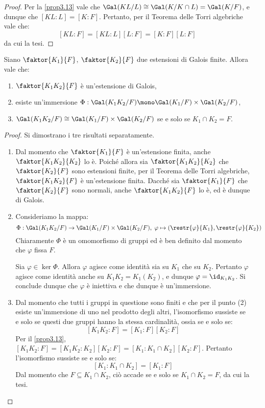 \documentclass[11pt]{scrartcl}
\begin{document}
	\begin{proof}
		Per la \autoref{prop3.13} vale che $\Gal(KL/L) \cong \Gal(K/K \cap L) =
		\Gal(K/F)$, e dunque che $[KL : L] = [K : F]$. Pertanto, per il Teorema
		delle Torri algebriche vale che:
		\[ [KL : F] = [KL : L] [L : F] = [K : F] [L : F] \]
		da cui la tesi.
	\end{proof}
	
	\begin{proposition}
		\label{prop3.15}
		Siano $\faktor{K_1}{F}$, $\faktor{K_2}{F}$ due estensioni di Galois finite. 
		Allora vale che:
		\begin{enumerate}[(1)]
			\item $\faktor{K_1K_2}{F}$ è un'estensione di Galois,
			\item esiste un'immersione $\Phi: \Gal(K_1K_2/F) \mono 
			\Gal(K_1/F)\times\Gal(K_2/F)$,
			\item $\Gal(K_1K_2/F)\cong \Gal(K_1/F)\times\Gal(K_2/F)$ se e solo 
			se $K_1\cap K_2 = F$. 
		\end{enumerate}
	\end{proposition}
	
	\begin{proof}
		Si dimostrano i tre risultati separatamente.

		\begin{enumerate}[(1)]
			\item Dal momento che $\faktor{K_1}{F}$ è un'estensione finita,
			anche $\faktor{K_1 K_2}{K_2}$ lo è. Poiché allora sia $\faktor{K_1 K_2}{K_2}$
			che $\faktor{K_2}{F}$ sono estensioni finite, per il Teorema delle
			Torri algebriche, $\faktor{K_1 K_2}{F}$ è un'estensione finita. Dacché
			sia $\faktor{K_1}{F}$ che $\faktor{K_2}{F}$ sono normali, anche
			$\faktor{K_1 K_2}{F}$ lo è, ed è dunque di Galois.

			\item Consideriamo la mappa:
			\[ \Phi : \Gal(K_1 K_2 / F) \to \Gal(K_1 / F) \times \Gal(K_2 / F), \; \varphi \mapsto \left(\restr{\varphi}{K_1}, \restr{\varphi}{K_2}\right) \]
			Chiaramente $\Phi$ è un omomorfismo di gruppi ed è ben definito dal momento
			che $\varphi$ fissa $F$. \medskip


			Sia $\varphi \in \ker \Phi$. Allora $\varphi$ agisce come identità
			sia su $K_1$ che su $K_2$. Pertanto $\varphi$ agisce come identità
			anche su $K_1 K_2 = K_1(K_2)$, e dunque $\varphi = \id_{K_1 K_2}$.
			Si conclude dunque che $\varphi$ è iniettiva e che dunque è
			un'immersione. 

			\item Dal momento che tutti i gruppi in questione sono finiti e che
			per il punto (2) esiste un'immersione di uno nel prodotto degli altri,
			l'isomorfismo sussiste se e solo se questi due gruppi hanno la stessa
			cardinalità, ossia se e solo se:
			\[ [K_1 K_2 : F] = [K_1 : F] [K_2 : F] \]
			Per il \autoref{prop3.13}, $[K_1 K_2 : F] = [K_1 K_2 : K_2] [K_2 : F]
			= [K_1 : K_1 \cap K_2] [K_2 : F]$. Pertanto l'isomorfismo sussiste
			se e solo se:
			\[ [K_1 : K_1 \cap K_2] = [K_1 : F] \]
			Dal momento che $F \subseteq K_1 \cap K_2$, ciò accade se e solo se
			$K_1 \cap K_2 = F$, da cui la tesi.
		\end{enumerate}
	\end{proof}
	
\end{document}
